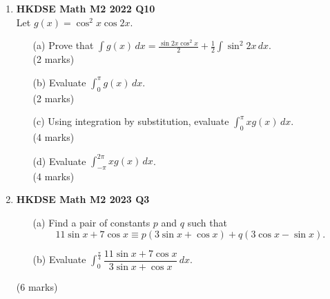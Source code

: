 \documentclass{report}
\begin{document}
\begin{enumerate}
	\item \textbf{HKDSE Math M2 2022 Q10}\\
	Let $g(x) = \cos^2{x}\cos{2x}$.
	\begin{enumerate}
		\item [(a)] Prove that $\displaystyle \int g(x) \,dx = \frac{\sin{2x}\cos^2{x}}{2} + \frac{1}{2} \int \sin^2{2x}\,dx$. \\(2 marks)
		\item [(b)] Evaluate $\displaystyle \int_{0}^{\pi} g(x) \,dx$. \\(2 marks)
		\item [(c)] Using integration by substitution, evaluate $\displaystyle \int_{0}^{\pi} xg(x) \,dx$. \\(4 marks)
		\item [(d)] Evaluate $\displaystyle \int_{-\pi}^{2\pi} xg(x) \,dx$. \\(4 marks)
	\end{enumerate}

	\item \textbf{HKDSE Math M2 2023 Q3}
	\begin{enumerate}
		\item [(a)]Find a pair of constants $p$ and $q$ such that $$11\sin{x} + 7\cos{x} \equiv p(3\sin{x} + \cos{x}) + q(3\cos{x} - \sin{x}).$$
		\item [(b)]Evaluate $\displaystyle \int^{\frac{\pi}{4}}_{0} \dfrac{11\sin{x} + 7\cos{x}}{3\sin{x} + \cos{x}} \,dx$.
	\end{enumerate}
	(6 marks)


\end{enumerate}
\end{document}
